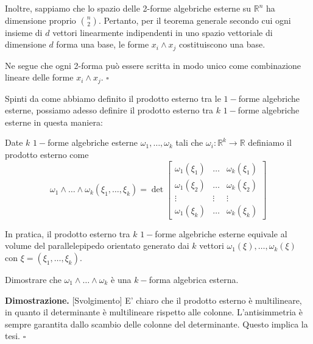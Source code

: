    Inoltre, sappiamo che lo spazio delle 2-forme algebriche esterne su \( \mathbb{R}^n \) ha dimensione proprio \( \binom{n}{2} \). Pertanto, per il teorema generale secondo cui ogni insieme di \( d \) vettori linearmente indipendenti in uno spazio vettoriale di dimensione \( d \) forma una base, le forme \( x_i \wedge x_j \) costituiscono una base.
	
    Ne segue che ogni 2-forma può essere scritta in modo unico come combinazione lineare delle forme \( x_i \wedge x_j \).
\hfill $\square$

Spinti da come abbiamo definito il prodotto esterno tra le $1-$forme algebriche esterne, possiamo adesso definire il prodotto esterno tra $k$ $1-$forme algebriche esterne in questa maniera:
%
\vspace{0.5cm}
\begin{definition}
    Date $k$ $1-$forme algebriche esterne $\omega_1, \ldots, \omega_k$ tali che $\omega_i: \mathbb{R}^k \to \mathbb{R}$ definiamo il prodotto esterno come
    $$
        \omega_1 \wedge \ldots \wedge \omega_k (\xi_1, \ldots, \xi_k) = \det{\begin{bmatrix}
            \omega_1(\xi_1) & \ldots & \omega_k(\xi_1) \\
            \omega_1(\xi_2) & \ldots & \omega_k(\xi_2) \\
            \vdots & \vdots & \vdots \\
            \omega_1(\xi_k) & \ldots & \omega_k(\xi_k)
        \end{bmatrix}}
    $$
\end{definition}
%
In pratica, il prodotto esterno tra $k$ $1-$forme algebriche esterne equivale al volume del parallelepipedo orientato generato dai $k$ vettori $\omega_1(\xi), \ldots, \omega_k(\xi)$ con $\xi = (\xi_1, \ldots, \xi_k)$.
%
\vspace{0.5cm}
\begin{exercise}
    Dimostrare che $\omega_1 \wedge \ldots \wedge \omega_k$ è una $k-$forma algebrica esterna.
\end{exercise}
%
\noindent \textbf{Dimostrazione. } [Svolgimento]
    E' chiaro che il prodotto esterno è multilineare, in quanto il determinante è multilineare rispetto alle colonne. L'antisimmetria è sempre garantita dallo scambio delle colonne del determinante. Questo implica la tesi.
\hfill $\square$
%
\vspace{0.5cm}
